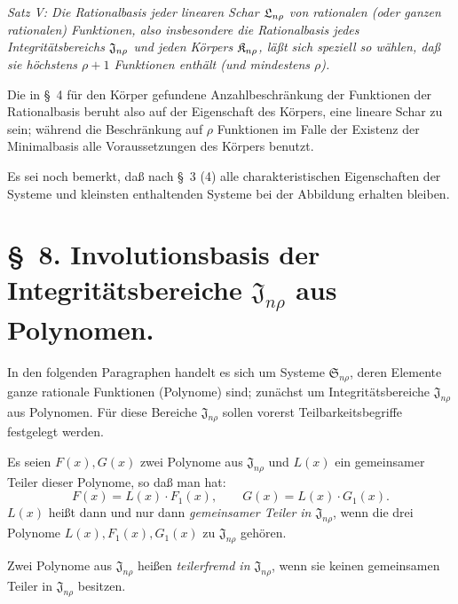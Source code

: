 \documentclass[11pt]{article}
\providecommand{\eps}{\varepsilon}
\begin{document}
\emph{Satz V: Die Rationalbasis jeder linearen Schar $\Lsys_{n\rho}$ von rationalen (oder ganzen rationalen) Funktionen, also insbesondere die Rationalbasis jedes Integritätsbereichs $\Jdom_{n\rho}$ und jeden Körpers $\Kfield_{n\rho}$, läßt sich speziell so wählen, daß sie höchstens $\rho+1$ Funktionen enthält (und mindestens $\rho$).}

Die in \S\ 4 für den Körper gefundene Anzahlbeschränkung der Funktionen der Rationalbasis beruht also auf der Eigenschaft des Körpers, eine lineare Schar zu sein; während die Beschränkung auf $\rho$ Funktionen im Falle der Existenz der Minimalbasis alle Voraussetzungen des Körpers benutzt.

Es sei noch bemerkt, daß nach \S\ 3 (4) alle charakteristischen Eigenschaften der Systeme und kleinsten enthaltenden Systeme bei der Abbildung erhalten bleiben.

\clearpage
\providecommand{\Kfield}{\mathfrak{K}}
\providecommand{\Ssys}{\mathfrak{S}}
\providecommand{\Jdom}{\mathfrak{J}}
\providecommand{\Gdom}{\mathfrak{G}}
\providecommand{\Lsys}{\mathfrak{L}}
\providecommand{\Omegaint}{[\Omega]}
\providecommand{\eps}{\varepsilon}

\providecommand{\Kfield}{\mathfrak{K}}
\providecommand{\Ssys}{\mathfrak{S}}
\providecommand{\Jdom}{\mathfrak{J}}
\providecommand{\Gdom}{\mathfrak{G}}
\providecommand{\Lsys}{\mathfrak{L}}
\providecommand{\Omegaint}{[\Omega]}
\providecommand{\eps}{\varepsilon}

\section*{\S\ 8. Involutionsbasis der Integritätsbereiche $\Jdom_{n\rho}$ aus Polynomen.}

In den folgenden Paragraphen handelt es sich um Systeme $\Ssys_{n\rho}$, deren Elemente ganze rationale Funktionen (Polynome) sind; zunächst um Integritätsbereiche $\Jdom_{n\rho}$ aus Polynomen. Für diese Bereiche $\Jdom_{n\rho}$ sollen vorerst Teilbarkeitsbegriffe festgelegt werden.

Es seien $F(x),G(x)$ zwei Polynome aus $\Jdom_{n\rho}$ und $L(x)$ ein gemeinsamer Teiler dieser Polynome, so daß man hat:
\[
  F(x)=L(x)\cdot F_1(x),\qquad G(x)=L(x)\cdot G_1(x).
\]
$L(x)$ heißt dann und nur dann \emph{gemeinsamer Teiler in $\Jdom_{n\rho}$}, wenn die drei Polynome $L(x),F_1(x),G_1(x)$ zu $\Jdom_{n\rho}$ gehören.

Zwei Polynome aus $\Jdom_{n\rho}$ heißen \emph{teilerfremd in $\Jdom_{n\rho}$}, wenn sie keinen gemeinsamen Teiler in $\Jdom_{n\rho}$ besitzen.
\end{document}
